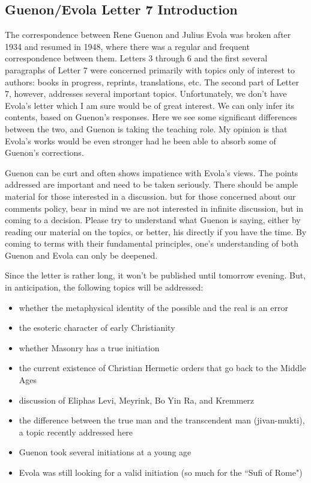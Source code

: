\subsection{Guenon/Evola Letter 7 Introduction}

The correspondence between Rene Guenon and Julius Evola was broken after 1934 and resumed in 1948, where there was a regular and frequent correspondence between them. Letters 3 through 6 and the first several paragraphs of Letter 7 were concerned primarily with topics only of interest to authors: books in progress, reprints, translations, etc. The second part of Letter 7, however, addresses several important topics. Unfortunately, we don't have Evola's letter which I am sure would be of great interest. We can only infer its contents, based on Guenon's responses. Here we see some significant differences between the two, and Guenon is taking the teaching role. My opinion is that Evola's works would be even stronger had he been able to absorb some of Guenon's corrections.

Guenon can be curt and often shows impatience with Evola's views. The points addressed are important and need to be taken seriously. There should be ample material for those interested in a discussion. but for those concerned about our comments policy, bear in mind we are not interested in infinite discussion, but in coming to a decision. Please try to understand what Guenon is saying, either by reading our material on the topics, or better, his directly if you have the time. By coming to terms with their fundamental principles, one's understanding of both Guenon and Evola can only be deepened.

Since the letter is rather long, it won't be published until tomorrow evening. But, in anticipation, the following topics will be addressed:

\begin{itemize}
\item whether the metaphysical identity of the possible and the real is an error 
\item the esoteric character of early Christianity 
\item whether Masonry has a true initiation 
\item the current existence of Christian Hermetic orders that go back to the Middle Ages 
\item discussion of Eliphas Levi, Meyrink, Bo Yin Ra, and Kremmerz 
\item the difference between the true man and the transcendent man (jivan-mukti), a topic recently addressed here 
\item Guenon took several initiations at a young age 
\item Evola was still looking for a valid initiation (so much for the ``Sufi of Rome") 
\end{itemize}


